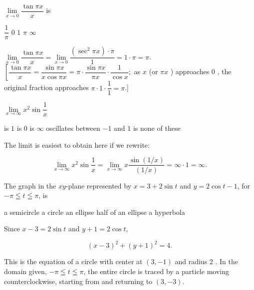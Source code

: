 \question
$\lim\limits_{x \to 0} \dfrac{\tan \pi x}{x}$ is
\begin{choices}
  \choice $\dfrac{1}{\pi}$
  \choice $0$
  \choice $1$
  \CorrectChoice $\pi$
  \choice $\infty$
\end{choices}
\begin{solution}
$\lim\limits_{x \to 0} \dfrac{\tan \pi x}{x}=\lim\limits_{x \to 0} \dfrac{\left(\sec ^{2} \pi x\right) \cdot \pi}{1}=1 \cdot \pi=\pi$.\\
$\left[\dfrac{\tan \pi x}{x}=\dfrac{\sin \pi x}{x \cos \pi x}=\pi \cdot \dfrac{\sin \pi x}{\pi x} \cdot \dfrac{1}{\cos x} ;\right.$ as $x$ (or $\pi x$ ) approaches 0 , the original fraction approaches $\pi \cdot 1 \cdot \dfrac{1}{1}=\pi$.]
\end{solution}





\newpage




\question
$\lim\limits_{x \to \infty} x^{2} \sin \dfrac{1}{x}$
\begin{choices}
  \choice is $1$
  \choice is $0$
  \CorrectChoice is $\infty$
  \choice oscillates between $-1$ and $1$
  \choice is none of these
\end{choices}
\begin{solution}
The limit is easiest to obtain here if we rewrite:


\[
\lim\limits_{x \to \infty} x^{2} \sin \dfrac{1}{x}=\lim\limits_{x \to \infty} x \dfrac{\sin (1 / x)}{(1 / x)}=\infty \cdot 1=\infty .
\]


\end{solution}

\question
The graph in the $x y$-plane represented by $x=3+2 \sin t$ and $y=2 \cos t-1$, for $-\pi \leqq t \leqq \pi$, is
\begin{choices}
  \choice a semicircle
  \CorrectChoice a circle
  \choice an ellipse
  \choice half of an ellipse
  \choice a hyperbola
\end{choices}
\begin{solution}
Since $x-3=2 \sin t$ and $y+1=2 \cos t$,


\[
(x-3)^{2}+(y+1)^{2}=4 .
\]

This is the equation of a circle with center at $(3,-1)$ and radius 2 . In the domain given, $-\pi \leqq t \leqq \pi$, the entire circle is traced by a particle moving counterclockwise, starting from and returning to $(3,-3)$.
\end{solution}

